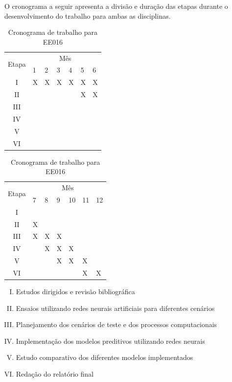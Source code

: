\documentclass[a4paper, 12pt]{article}
\begin{document}
O cronograma a seguir apresenta a divisão e duração das etapas durante o desenvolvimento do trabalho para ambas as disciplinas.
\vspace{1em}

\begin{table}[!htb]
    \begin{subtable}{.5\linewidth}
      \centering
		\begin{tabular}{|c|l|l|l|l|l|l|}
		\hline
		\multirow{2}{*}{Etapa} & \multicolumn{6}{c|}{Mês} \\ \cline{2-7} 
		                       & 1  & 2  & 3  & 4 & 5 & 6 \\ \hline
		I                      & X  & X  & X  & X & X & X \\ \hline
		II                     &    &    &    &  & X & X \\ \hline
		III                    &    &    &    &   &   &   \\ \hline
		IV                    &    &    &    &   &   &   \\ \hline
		V                    &    &    &    &   &   &   \\ \hline
		VI                    &    &    &    &   &   &   \\ \hline
		\end{tabular}
		\caption{Cronograma de trabalho para EE015}
    \end{subtable}%
    \begin{subtable}{.5\linewidth}
      \centering
		\begin{tabular}{|c|l|l|l|l|l|l|}
		\hline
		\multirow{2}{*}{Etapa} & \multicolumn{6}{c|}{Mês} \\ \cline{2-7} 
		                       & 7  & 8  & 9  & 10 & 11 & 12 \\ \hline
		I                      &    &    &    &   &   &   \\ \hline
		II                     & X &   &   &  &   &   \\ \hline
		III                    & X  & X  & X &  &  & \\ \hline
		IV                    &    &  X & X  & X &   &   \\ \hline
		V                    &    &    &  X & X & X &   \\ \hline
		VI                    &    &    &   &  & X & X \\ \hline		
		\end{tabular}
		\caption{Cronograma de trabalho para EE016}
    \end{subtable} 
\end{table}
\begin{enumerate}[I.]
\item Estudos dirigidos e revisão bibliográfica 
\item Ensaios utilizando redes neurais artificiais para diferentes cenários
\item Planejamento dos cenários de teste e dos processos computacionais
\item Implementação dos modelos preditivos utilizando redes neurais
\item Estudo comparativo dos diferentes modelos implementados
\item Redação do relatório final
\end{enumerate}

\nocite{*}


\end{document}
